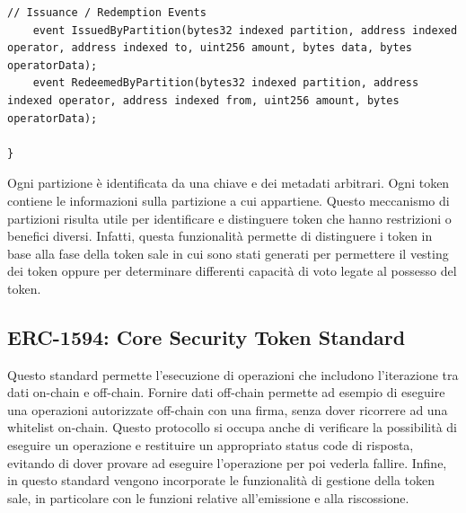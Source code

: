\begin{lstlisting}[language=Solidity,numbers=none]
    // Issuance / Redemption Events
    event IssuedByPartition(bytes32 indexed partition, address indexed operator, address indexed to, uint256 amount, bytes data, bytes operatorData);
    event RedeemedByPartition(bytes32 indexed partition, address indexed operator, address indexed from, uint256 amount, bytes operatorData);

}
\end{lstlisting}

Ogni partizione è identificata da una chiave e dei metadati arbitrari. Ogni token contiene le informazioni sulla partizione a cui appartiene. 
Questo meccanismo di partizioni risulta utile per identificare e distinguere token che hanno restrizioni o benefici diversi. Infatti, questa funzionalità permette di distinguere i token in base alla fase della token sale in cui sono stati generati per permettere il vesting dei token oppure per determinare differenti capacità di voto legate al possesso del token. 

\subsection{ERC-1594: Core Security Token Standard}
Questo standard permette l'esecuzione di operazioni che includono l'iterazione tra dati on-chain e off-chain. Fornire dati off-chain permette ad esempio di eseguire una operazioni autorizzate off-chain con una firma, senza dover ricorrere ad una whitelist on-chain. Questo protocollo si occupa anche di verificare la possibilità di eseguire un operazione e restituire un appropriato status code di risposta, evitando di dover provare ad eseguire l'operazione per poi vederla fallire. 
Infine, in questo standard vengono incorporate le funzionalità di gestione della token sale, in particolare con le funzioni relative all'emissione e alla riscossione. 

